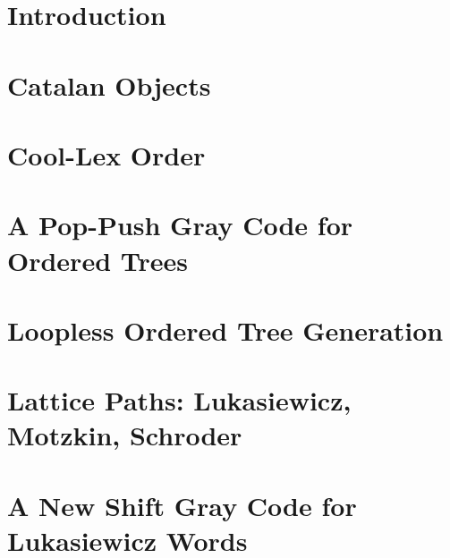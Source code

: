 


\maketitle
\tableofcontents




\chapter{Introduction}

\chapter{Catalan Objects} \label{chap:catalan}

\chapter{Cool-Lex Order}\label{chap:cool}


\chapter{A Pop-Push Gray Code for Ordered Trees} \label{chap:otree-graycode}

\chapter{Loopless Ordered Tree Generation} \label{chap:otree-implementation}



\chapter{Lattice Paths: Lukasiewicz, Motzkin, Schroder}
 \label{chap:luka-background}

\chapter{A New Shift Gray Code for Lukasiewicz Words} \label{chap:luka-graycode}

